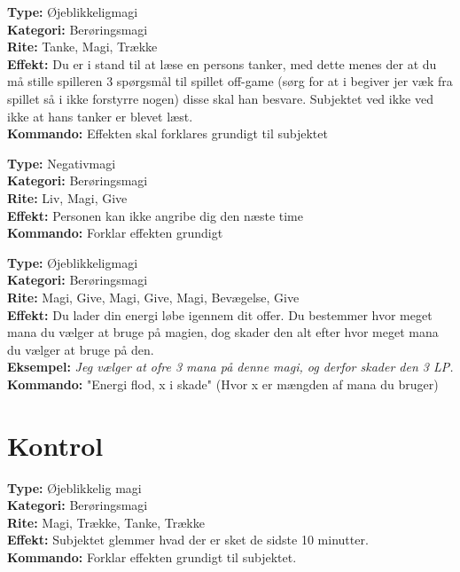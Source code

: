 \begin{passiv*}
\textbf{Type:} Øjeblikkeligmagi\\
\textbf{Kategori:} Berøringsmagi\\
\textbf{Rite:} Tanke, Magi, Trække\\
\textbf{Effekt:} Du er i stand til at læse en persons tanker, med dette menes der at du må stille spilleren 3 spørgsmål til spillet off-game (sørg for at i begiver jer væk fra spillet så i ikke forstyrre nogen) disse skal han besvare. Subjektet ved ikke ved ikke at hans tanker er blevet læst.\\
\textbf{Kommando:} Effekten skal forklares grundigt til subjektet
\end{passiv*}

\begin{passiv*}[Fred]
\textbf{Type:} Negativmagi\\
\textbf{Kategori:} Berøringsmagi\\
\textbf{Rite:} Liv, Magi, Give\\
\textbf{Effekt:} Personen kan ikke angribe dig den næste time\\
\textbf{Kommando:} Forklar effekten grundigt
\end{passiv*}

\begin{passiv*}
\textbf{Type:} Øjeblikkeligmagi\\
\textbf{Kategori:} Berøringsmagi\\
\textbf{Rite:} Magi, Give, Magi, Give, Magi, Bevægelse, Give\\
\textbf{Effekt:} Du lader din energi løbe igennem dit offer. Du bestemmer hvor meget mana du vælger at bruge på magien, dog skader den alt efter hvor meget mana du vælger at bruge på den.\\
\textbf{Eksempel:} \textit{ Jeg vælger at ofre 3 mana på denne magi, og derfor skader den 3 LP.}\\
\textbf{Kommando:} "Energi flod, x i skade" (Hvor x er mængden af mana du bruger)\\
\end{passiv*}

\section*{Kontrol}

\begin{kontrol*}[Glemsel]
\textbf{Type:} Øjeblikkelig magi\\
\textbf{Kategori:} Berøringsmagi\\
\textbf{Rite:} Magi, Trække, Tanke, Trække\\
\textbf{Effekt:} Subjektet glemmer hvad der er sket de sidste 10 minutter.\\
\textbf{Kommando:} Forklar effekten grundigt til subjektet.
\end{kontrol*}

